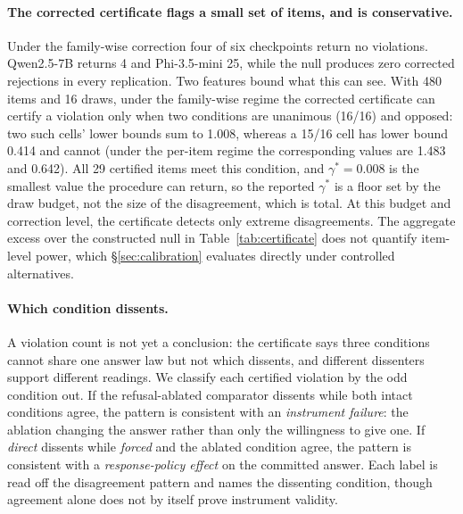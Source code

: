 \paragraph{The corrected certificate flags a small set of items, and is
conservative.} Under the family-wise correction four of six checkpoints return no violations.
Qwen2.5-7B returns 4 and Phi-3.5-mini 25, while the null produces zero
corrected rejections in every replication. Two features bound what this can
see. With 480 items and 16 draws, under the family-wise regime the corrected
certificate can certify a violation only when two conditions are unanimous
(16/16) and opposed: two such cells' lower bounds sum to 1.008, whereas a 15/16
cell has lower bound 0.414 and cannot (under the per-item regime the
corresponding values are 1.483 and 0.642). All 29 certified items meet this condition, and $\gamma^*=0.008$
is the smallest value the procedure can return, so the reported $\gamma^*$ is a
floor set by the draw budget, not the size of the disagreement, which is
total. At this budget and correction level, the certificate detects only
extreme disagreements. The aggregate excess over the constructed null in
Table~\ref{tab:certificate} does not quantify item-level power, which
\S\ref{sec:calibration} evaluates directly under controlled alternatives.

\paragraph{Which condition dissents.} A violation count is not yet a
conclusion: the certificate says three conditions cannot share one answer law
but not which dissents, and different dissenters support different
readings. We classify each certified violation by the odd condition out. If the refusal-ablated comparator dissents while both intact
conditions agree, the pattern is consistent with an \emph{instrument failure}:
the ablation changing the answer rather than only the willingness to give one.
If \textit{direct} dissents while \textit{forced} and the ablated condition
agree, the pattern is consistent with a \emph{response-policy effect} on the
committed answer. Each label is read off the disagreement pattern and names
the dissenting condition, though agreement alone does not by itself prove
instrument validity.

